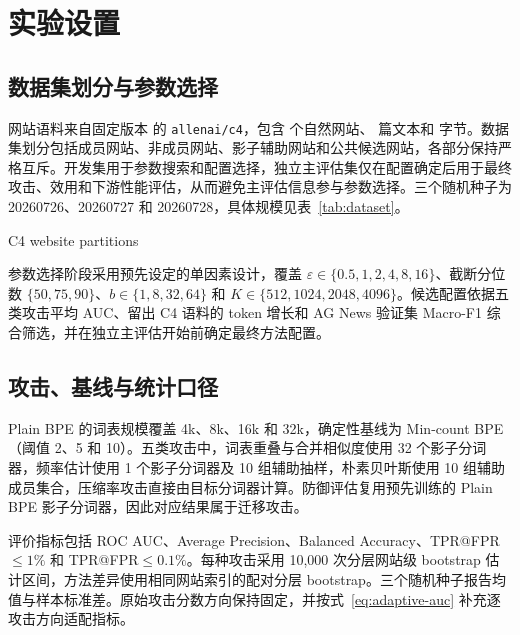 \section{实验设置}

\subsection{数据集划分与参数选择}

网站语料来自固定版本 \FinalCfourRevision{} 的 \texttt{allenai/c4}\cite{raffel2020c4}，包含 \FinalCorpusSites{} 个自然网站、\FinalCorpusTexts{} 篇文本和 \FinalCorpusBytes{} 字节。数据集划分包括成员网站、非成员网站、影子辅助网站和公共候选网站，各部分保持严格互斥。开发集用于参数搜索和配置选择，独立主评估集仅在配置确定后用于最终攻击、效用和下游性能评估，从而避免主评估信息参与参数选择。三个随机种子为 20260726、20260727 和 20260728，具体规模见表~\ref{tab:dataset}。

\begin{table}
\centering
\caption{C4 网站数据划分}{C4 website partitions}
\resizebox{\linewidth}{!}{}
\label{tab:dataset}
\end{table}

参数选择阶段采用预先设定的单因素设计，覆盖 $\varepsilon\in\{0.5,1,2,4,8,16\}$、截断分位数 $\{50,75,90\}$、$b\in\{1,8,32,64\}$ 和 $K\in\{512,1024,2048,4096\}$。候选配置依据五类攻击平均 AUC、留出 C4 语料的 token 增长和 AG News 验证集 Macro-F1 综合筛选，并在独立主评估开始前确定最终方法配置。

\subsection{攻击、基线与统计口径}

Plain BPE 的词表规模覆盖 4k、8k、16k 和 32k，确定性基线为 Min-count BPE（阈值 2、5 和 10）。五类攻击中，词表重叠与合并相似度使用 32 个影子分词器，频率估计使用 1 个影子分词器及 10 组辅助抽样，朴素贝叶斯使用 10 组辅助成员集合，压缩率攻击直接由目标分词器计算。防御评估复用预先训练的 Plain BPE 影子分词器，因此对应结果属于迁移攻击。

评价指标包括 ROC AUC、Average Precision、Balanced Accuracy、TPR@FPR$\leq1\%$ 和 TPR@FPR$\leq0.1\%$。每种攻击采用 10,000 次分层网站级 bootstrap 估计区间，方法差异使用相同网站索引的配对分层 bootstrap。三个随机种子报告均值与样本标准差。原始攻击分数方向保持固定，并按式~\eqref{eq:adaptive-auc} 补充逐攻击方向适配指标。

